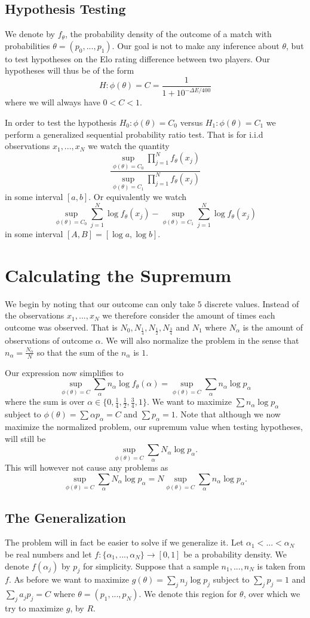 \documentclass{article}
\theoremstyle{plain}
\theoremstyle{definition}
\begin{document}
\subsection{Hypothesis Testing}
We denote by $f_\theta$, the probability density of the outcome of a match with probabilities
$\theta=(p_0,...,p_1)$. Our goal is not to make any inference about $\theta$, but to test
hypotheses on the Elo rating difference between two players. Our hypotheses will thus be of
the form $$H:\phi(\theta)=C=\frac1{1+10^{-\Delta E/400}}$$ where we will always have
$0<C<1$.

In order to test the hypothesis $H_0:\phi(\theta)=C_0$ versus $H_1:\phi(\theta)=C_1$ we perform
a generalized sequential probability ratio test. That is for i.i.d observations $x_1,...,x_N$
we watch the quantity $$\frac{\sup_{\phi(\theta)=C_0}\prod_{j=1}^N f_\theta(x_j)}{\sup_{\phi(\theta)
=C_1}\prod_{j=1}^N f_\theta(x_j)}$$ in some interval $[a,b]$. Or equivalently we watch $$\sup_
{\phi(\theta)=C_0}\sum_{j=1}^N\log{f_\theta(x_j)}-\sup_{\phi(\theta)=C_1}\sum_{j=1}^N\log{f_\theta
(x_j)}$$ in some interval $[A,B]=[\log a,\log b]$.

\section{Calculating the Supremum}
We begin by noting that our outcome can only take $5$ discrete values.
Instead of the observations $x_1,...,x_N$ we therefore consider the amount of times each
outcome was observed. That is $N_0,N_\frac14,N_\frac12,N_\frac34$ and $N_1$ where
$N_\alpha$ is the amount of observations of outcome $\alpha$. We will also normalize the problem
in the sense that $n_\alpha=\frac{N_\alpha}{N}$ so that the sum of the $n_\alpha$ is $1$.

Our expression now simplifies to $$\sup_{\phi(\theta)=C}\sum_\alpha n_\alpha\log{f_\theta(\alpha)}=
\sup_{\phi(\theta)=C}\sum_\alpha n_\alpha\log{p_\alpha}$$ where the sum is over $\alpha\in
\{0,\frac14,\frac12,\frac34,1\}$. We want to maximize $\sum n_\alpha\log
{p_\alpha}$ subject to $\phi(\theta)=\sum \alpha p_\alpha=C$ and $\sum p_\alpha=1$. Note that
although we now maximize the normalized problem, our supremum value when testing hypotheses,
will still be $$\sup_{\phi(\theta)=C}\sum_\alpha N_\alpha\log{p_\alpha}.$$ This will however
not cause any problems as $$\sup_{\phi(\theta)=C}\sum_\alpha N_\alpha\log{p_\alpha}=
N\sup_{\phi(\theta)=C}\sum_\alpha n_\alpha\log{p_\alpha}.$$

\subsection{The Generalization}
The problem will in fact be easier to solve if we generalize it. Let $\alpha_1<...<\alpha_N$ be
real numbers and let $f:\{\alpha_1,...,\alpha_N\}\to [0,1]$ be a probability density. We denote
$f(\alpha_j)$ by $p_j$ for simplicity. Suppose that a sample $n_1,...,n_N$ is taken from $f$.
As before we want to maximize $g(\theta)=\sum_j n_j\log p_j$ subject to $\sum_j p_j=1$ and
$\sum_j a_jp_j=C$ where $\theta=(p_1,...,p_N)$. We denote this region for $\theta$, over which
we try to maximize $g$, by $R$.
\end{document}
